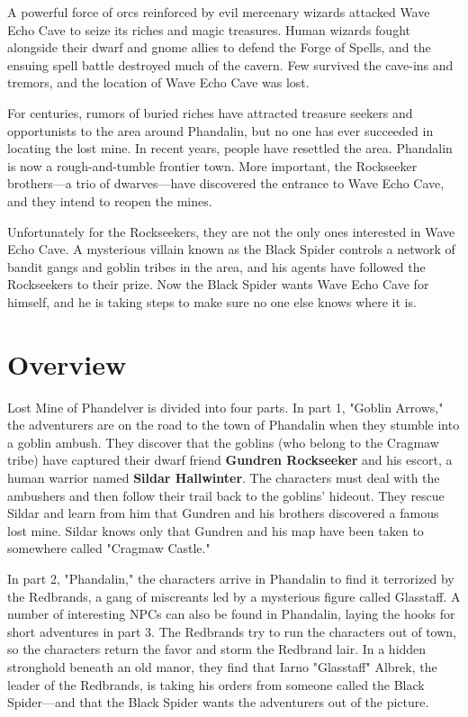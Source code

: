 \documentclass[10pt,a4paper,twoside,bg=print,twocolumn,openany,nodeprecatedcode]{dndbook}
\begin{document}
A powerful force of orcs reinforced by evil mercenary wizards attacked Wave Echo Cave to seize its riches and magic treasures. Human wizards fought alongside their dwarf and gnome allies to defend the Forge of Spells, and the ensuing spell battle destroyed much of the cavern. Few survived the cave-ins and tremors, and the location of Wave Echo Cave was lost.

For centuries, rumors of buried riches have attracted treasure seekers and opportunists to the area around Phandalin, but no one has ever succeeded in locating the lost mine. In recent years, people have resettled the area. Phandalin is now a rough-and-tumble frontier town. More important, the Rockseeker brothers—a trio of dwarves—have discovered the entrance to Wave Echo Cave, and they intend to reopen the mines.

Unfortunately for the Rockseekers, they are not the only ones interested in Wave Echo Cave. A mysterious villain known as the Black Spider controls a network of bandit gangs and goblin tribes in the area, and his agents have followed the Rockseekers to their prize. Now the Black Spider wants Wave Echo Cave for himself, and he is taking steps to make sure no one else knows where it is.

\section{Overview}
Lost Mine of Phandelver is divided into four parts. In part 1, "Goblin Arrows," the adventurers are on the road to the town of Phandalin when they stumble into a goblin ambush. They discover that the goblins (who belong to the Cragmaw tribe) have captured their dwarf friend \textbf{Gundren Rockseeker} and his escort, a human warrior named \textbf{Sildar Hallwinter}. The characters must deal with the ambushers and then follow their trail back to the goblins' hideout. They rescue Sildar and learn from him that Gundren and his brothers discovered a famous lost mine. Sildar knows only that Gundren and his map have been taken to somewhere called "Cragmaw Castle."

In part 2, "Phandalin," the characters arrive in Phandalin to find it terrorized by the Redbrands, a gang of miscreants led by a mysterious figure called Glasstaff. A number of interesting NPCs can also be found in Phandalin, laying the hooks for short adventures in part 3. The Redbrands try to run the characters out of town, so the characters return the favor and storm the Redbrand lair. In a hidden stronghold beneath an old manor, they find that Iarno "Glasstaff" Albrek, the leader of the Redbrands, is taking his orders from someone called the Black Spider—and that the Black Spider wants the adventurers out of the picture.
\end{document}
